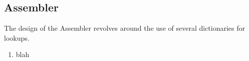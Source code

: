 \documentclass[11pt]{article}
\begin{document}
\subsection{Assembler}
The design of the Assembler revolves around the use of several dictionaries for lookups.

\begin{enumerate}

\item
blah
\end{enumerate}
\end{document}
